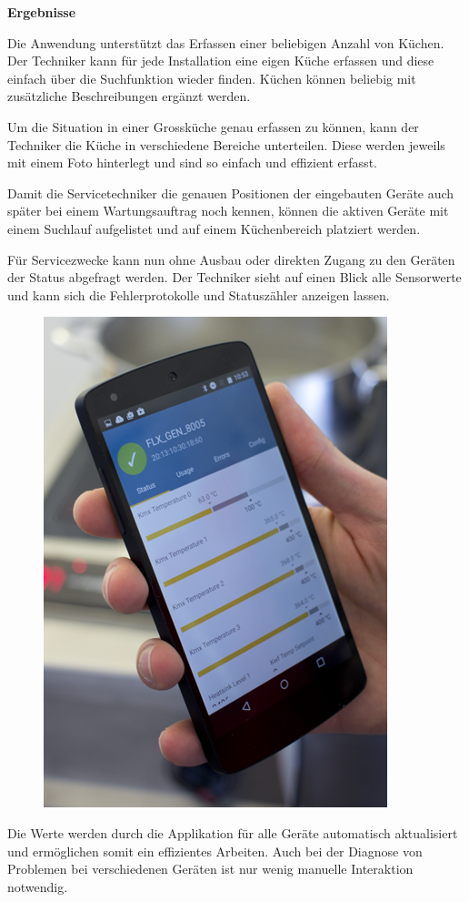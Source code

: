 \textbf{Ergebnisse}

Die Anwendung unterstützt das Erfassen einer beliebigen Anzahl von Küchen. Der Techniker kann für jede Installation eine eigen Küche erfassen und diese einfach über die Suchfunktion wieder finden. Küchen können beliebig mit zusätzliche Beschreibungen ergänzt werden.

Um die Situation in einer Grossküche genau erfassen zu können, kann der Techniker die Küche in verschiedene Bereiche unterteilen. Diese werden jeweils mit einem Foto hinterlegt und sind so einfach und effizient erfasst.

Damit die Servicetechniker die genauen Positionen der eingebauten Geräte auch später bei einem Wartungsauftrag noch kennen, können die aktiven Geräte mit einem Suchlauf aufgelistet und auf einem Küchenbereich platziert werden.
\WFclear

Für Servicezwecke kann nun ohne Ausbau oder direkten Zugang zu den Geräten der Status abgefragt werden. Der Techniker sieht auf einen Blick alle Sensorwerte und kann sich die Fehlerprotokolle und Statuszähler anzeigen lassen.\\
\begin{figure}
	\vspace{-.5cm}
	\begin{center}
		\includegraphics[scale=1]{start/img/img_7610}
	\end{center}
	\vspace{-1cm}
\end{figure}
Die Werte werden durch die Applikation für alle Geräte automatisch aktualisiert und ermöglichen somit ein effizientes Arbeiten. Auch bei der Diagnose von Problemen bei verschiedenen Geräten ist nur wenig manuelle Interaktion notwendig.

